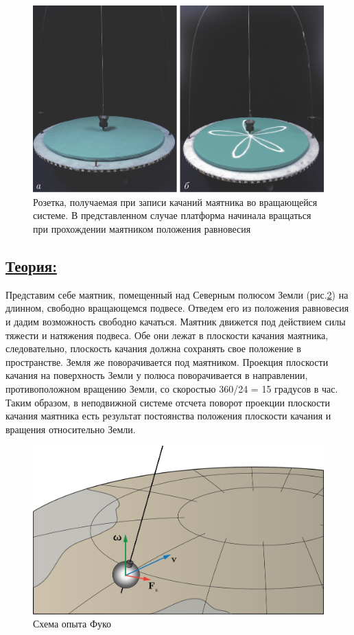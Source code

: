 \documentclass[14pt,a4paper,oneside]{extarticle}	%
\begin{document}
\begin{figure}[H] 	
	\centering 	
	\includegraphics[width=0.8\linewidth]{fuko-3.png}
	\caption{Розетка, получаемая при записи качаний маятника во вращающейся системе. В представленном случае платформа начинала вращаться при прохождении маятником положения равновесия}
	\label{fuko-3}
\end{figure}

	
\newpage
	\subsection*{\underline{Теория:}}
	
	Представим себе маятник, помещенный над Северным полюсом Земли (рис.\ref{fuko-4}) на длинном, свободно вращающемся подвесе.
	Отведем его из положения равновесия и дадим возможность свободно качаться.
	Маятник движется под действием силы тяжести и натяжения подвеса.
	Обе они лежат в плоскости качания маятника, следовательно, плоскость качания должна сохранять свое положение в пространстве.
	Земля же поворачивается под маятником.
	Проекция плоскости качания на поверхность Земли у полюса поворачивается в направлении, противоположном вращению Земли, со скоростью 360/24 = 15 градусов в час.
	Таким образом, в неподвижной системе отсчета поворот проекции плоскости качания маятника есть результат постоянства положения плоскости качания и вращения относительно Земли.
	
	\begin{figure}[H] 	
		\centering 	
		\includegraphics[width=0.75\linewidth]{fuko-4.png}
		\caption{Схема опыта Фуко}
		\label{fuko-4}
	\end{figure}
		
\end{document}
